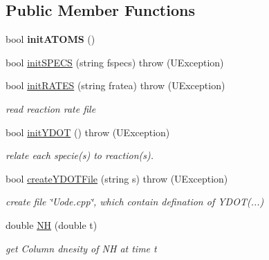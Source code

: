 \subsection*{Public Member Functions}
\begin{DoxyCompactItemize}
\item 
\mbox{\label{classUModel_a43f699e133cbab680dc34cbd1f1c90cb}} 
bool {\bfseries init\+A\+T\+O\+MS} ()
\item 
bool \hyperlink{classUModel_a29ccc1ecbbd13a3fed4d91395691553b}{init\+S\+P\+E\+CS} (string fspecs)  throw (\+U\+Exception)
\item 
\mbox{\label{classUModel_a0f40dac2aa16b1a25ec228c00f961176}} 
bool \hyperlink{classUModel_a0f40dac2aa16b1a25ec228c00f961176}{init\+R\+A\+T\+ES} (string fratea)  throw (\+U\+Exception)
\begin{DoxyCompactList}\small\item\em read reaction rate file \end{DoxyCompactList}\item 
\mbox{\label{classUModel_a83a9a07d304540be3532c4db0c44b648}} 
bool \hyperlink{classUModel_a83a9a07d304540be3532c4db0c44b648}{init\+Y\+D\+OT} ()  throw (\+U\+Exception)
\begin{DoxyCompactList}\small\item\em relate each specie(s) to reaction(s). \end{DoxyCompactList}\item 
\mbox{\label{classUModel_acca59f52a63d263e3e924ba3b08a0db6}} 
bool \hyperlink{classUModel_acca59f52a63d263e3e924ba3b08a0db6}{create\+Y\+D\+O\+T\+File} (string s)  throw (\+U\+Exception)
\begin{DoxyCompactList}\small\item\em create file \char`\"{}\+Uode.\+cpp\char`\"{}, which contain defination of Y\+D\+OT(...) \end{DoxyCompactList}\item 
\mbox{\label{classUModel_a060609ed8911e53450beda9cefdb6240}} 
double \hyperlink{classUModel_a060609ed8911e53450beda9cefdb6240}{NH} (double t)
\begin{DoxyCompactList}\small\item\em get Column dnesity of NH at time t \end{DoxyCompactList}\item 

\end{DoxyCompactItemize}

